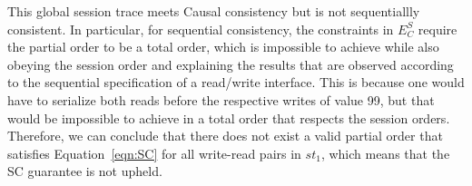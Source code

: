\documentclass[journal, compsoc]{IEEEtran}
\begin{document}
	This global session trace meets Causal consistency but is not sequentiallly consistent.
	In particular, for sequential consistency, the constraints in $E^S_C$ require the partial order to be a total order, which is impossible to achieve while also obeying the session order and explaining the results that are observed according to the sequential specification of a read/write interface. This is because one would have to serialize both reads before the respective writes of value 99, but that would be impossible to achieve in a total order that respects the session orders.
	Therefore, we can conclude that there does not exist a valid partial order that satisfies Equation~\ref{eqn:SC} for all write-read pairs in $\mathit{st}_1$, which means that the SC guarantee is not upheld.
\end{document}
